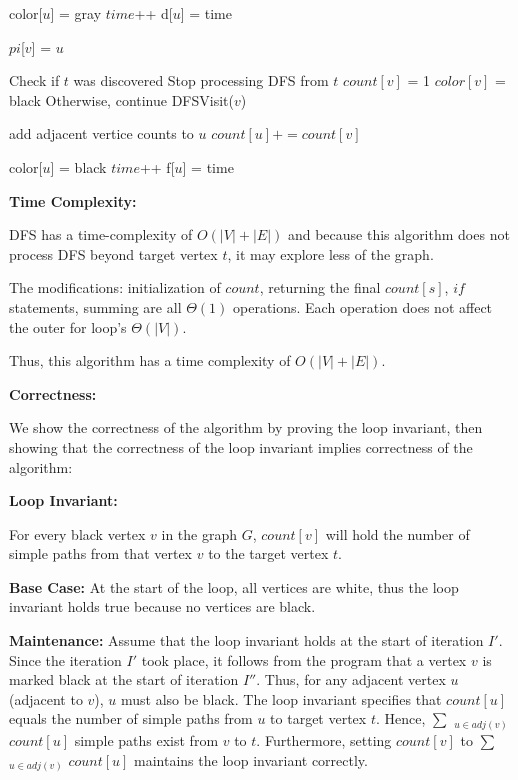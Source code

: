 \documentclass[a4paper]{report}
\begin{document}
\begin{enumerate}
\begin{algorithmic}[1]
    \EndFunction
    \end{algorithmic}

    \begin{algorithmic}[1]
      \State color[$u$] = gray
      \State $time$++
      \State d[$u$] = time

          \State $pi$[$v$] = $u$


          \Comment Check if $t$ was discovered
            \Comment Stop processing DFS from $t$ 
            \State $count[v]$ = 1
            \State $color[v]$ = black
          \Else
            \Comment Otherwise, continue
            \State DFSVisit($v$)
          \EndIf
        \EndIf

        \Comment add adjacent vertice counts to $u$
        \State $count[u] += count[v]$
      \EndFor

      \State color[$u$] = black
      \State $time$++
      \State f[$u$] = time
    \EndFunction
    \end{algorithmic}

    {\bf Time Complexity:}

    DFS has a time-complexity of $O(|V| + |E|)$ and because this algorithm does not process DFS beyond target vertex $t$, it 
    may explore less of the graph. 

    The modifications: initialization of $count$, returning the final $count[s]$, $if$ statements, summing are all 
    $\Theta(1)$ operations. Each operation does not affect the outer for loop's $\Theta(|V|)$.

    Thus, this algorithm has a time complexity of $O(|V| + |E|)$.

    {\bf Correctness:}

    We show the correctness of the algorithm by proving the loop invariant, then showing that the correctness of the loop
    invariant implies correctness of the algorithm:

    {\bf Loop Invariant:}

    For every black vertex $v$ in the graph $G$, $count[v]$ will hold the number of simple paths from that vertex $v$ to the target 
    vertex $t$. 

    {\bf Base Case:}
    At the start of the loop, all vertices are white, thus the loop invariant holds true because no vertices are black. 

    {\bf Maintenance:}
    Assume that the loop invariant holds at the start of iteration $I'$. Since the iteration $I'$ took place, it follows 
    from the program that a vertex $v$ is marked black at the start of iteration $I''$. 
    Thus, for any adjacent vertex $u$ (adjacent to $v$), $u$ must also be black. The loop invariant specifies that $count[u]$ equals 
    the number of simple paths from $u$ to target vertex $t$. Hence, $\sum$ $_{u\in adj(v)}$ $count[u]$ simple paths 
    exist from $v$ to $t$. Furthermore, setting $count[v]$ to $\sum$ $_{u\in adj(v)}$ $count[u]$ maintains the loop invariant 
    correctly. 


\end{enumerate}
\end{document}
